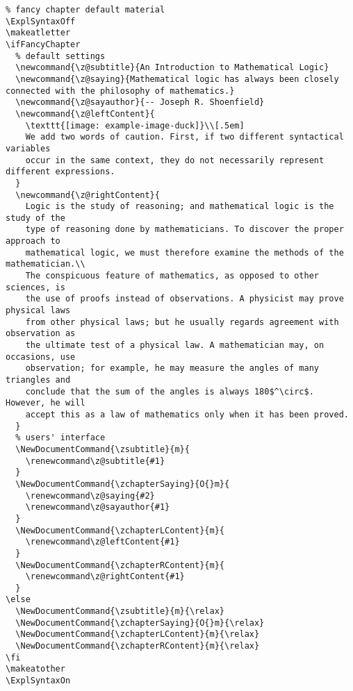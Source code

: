 \begin{verbatim}
% fancy chapter default material
\ExplSyntaxOff
\makeatletter
\ifFancyChapter
  % default settings
  \newcommand{\z@subtitle}{An Introduction to Mathematical Logic}
  \newcommand{\z@saying}{Mathematical logic has always been closely connected with the philosophy of mathematics.}
  \newcommand{\z@sayauthor}{-- Joseph R. Shoenfield}
  \newcommand{\z@leftContent}{
    \texttt{[image: example-image-duck]}\\[.5em]
    We add two words of caution. First, if two different syntactical variables
    occur in the same context, they do not necessarily represent different expressions.
  }
  \newcommand{\z@rightContent}{
    Logic is the study of reasoning; and mathematical logic is the study of the 
    type of reasoning done by mathematicians. To discover the proper approach to 
    mathematical logic, we must therefore examine the methods of the mathematician.\\
    The conspicuous feature of mathematics, as opposed to other sciences, is
    the use of proofs instead of observations. A physicist may prove physical laws
    from other physical laws; but he usually regards agreement with observation as
    the ultimate test of a physical law. A mathematician may, on occasions, use
    observation; for example, he may measure the angles of many triangles and
    conclude that the sum of the angles is always 180$^\circ$. However, he will 
    accept this as a law of mathematics only when it has been proved.
  }
  % users' interface
  \NewDocumentCommand{\zsubtitle}{m}{
    \renewcommand\z@subtitle{#1}
  }
  \NewDocumentCommand{\zchapterSaying}{O{}m}{
    \renewcommand\z@saying{#2}
    \renewcommand\z@sayauthor{#1}
  }
  \NewDocumentCommand{\zchapterLContent}{m}{
    \renewcommand\z@leftContent{#1}
  }
  \NewDocumentCommand{\zchapterRContent}{m}{
    \renewcommand\z@rightContent{#1}
  }
\else 
  \NewDocumentCommand{\zsubtitle}{m}{\relax}
  \NewDocumentCommand{\zchapterSaying}{O{}m}{\relax}
  \NewDocumentCommand{\zchapterLContent}{m}{\relax}
  \NewDocumentCommand{\zchapterRContent}{m}{\relax}
\fi
\makeatother
\ExplSyntaxOn
\end{verbatim}